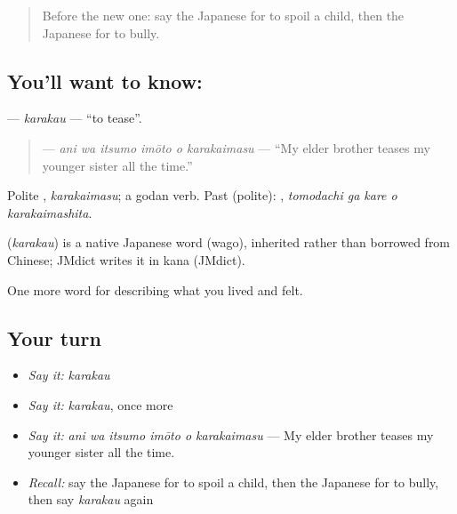 \label{lesson:JA-C478-karakau}



\begin{quote}
Before the new one: say the Japanese for to spoil a child, then the Japanese for to bully.
\end{quote}

\subsection*{You'll want to know: }
\textbf{} — \emph{karakau} — \textquotedblleft{}to tease\textquotedblright{}.

\begin{quote}
\textbf{   } — \emph{ani wa itsumo imōto o karakaimasu} — \textquotedblleft{}My elder brother teases my younger sister all the time.\textquotedblright{}
\end{quote}

Polite \textbf{}, \emph{karakaimasu}; a godan verb. Past (polite): \textbf{  }, \emph{tomodachi ga kare o karakaimashita}.

\begin{cousinweb}
\textbf{} (\emph{karakau}) is a native Japanese word (wago), inherited rather than borrowed from Chinese; JMdict writes it in kana (JMdict).
\end{cousinweb}

\begin{grammarlens}[title={What you've built}]
One more word for describing what you lived and felt.
\end{grammarlens}

\subsection*{Your turn}
\begin{itemize}
\raggedright
  \item \emph{Say it:} \emph{karakau}
  \item \emph{Say it:} \emph{karakau}, once more
  \item \emph{Say it:} \emph{ani wa itsumo imōto o karakaimasu} — My elder brother teases my younger sister all the time.
  \item \emph{Recall:} say the Japanese for to spoil a child, then the Japanese for to bully, then say \emph{karakau} again
\end{itemize}

